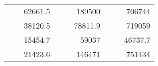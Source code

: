 \begin{table}[H]
\begin{tabular}{|ccrccrccc}
\rowcolor[HTML]{DDFDFF} 
\multicolumn{1}{|c|}{\cellcolor[HTML]{FFFFC7}}                                & \multicolumn{1}{c|}{\cellcolor[HTML]{DDFDFF}}                      & \multicolumn{1}{r|}{\cellcolor[HTML]{DAE8FC}62661.5}   & \multicolumn{1}{c|}{\cellcolor[HTML]{FFFFC7}}                                & \multicolumn{1}{c|}{\cellcolor[HTML]{DDFDFF}}                       & \multicolumn{1}{r|}{\cellcolor[HTML]{DDFDFF}189500}    & \multicolumn{1}{c|}{\cellcolor[HTML]{FFFFC7}}                                & \multicolumn{1}{c|}{\cellcolor[HTML]{DDFDFF}}                      & \multicolumn{1}{r|}{\cellcolor[HTML]{DDFDFF}706744}    \\ \cline{3-3} \cline{6-6} \cline{9-9} 
\multicolumn{1}{|c|}{\cellcolor[HTML]{FFFFC7}}                                & \multicolumn{1}{c|}{\cellcolor[HTML]{DDFDFF}}                      & \multicolumn{1}{r|}{\cellcolor[HTML]{DDFDFF}38120.5}   & \multicolumn{1}{c|}{\cellcolor[HTML]{FFFFC7}}                                & \multicolumn{1}{c|}{\cellcolor[HTML]{DDFDFF}}                       & \multicolumn{1}{r|}{\cellcolor[HTML]{DAE8FC}78811.9}   & \multicolumn{1}{c|}{\cellcolor[HTML]{FFFFC7}}                                & \multicolumn{1}{c|}{\cellcolor[HTML]{DDFDFF}}                      & \multicolumn{1}{r|}{\cellcolor[HTML]{DAE8FC}719059}    \\ \cline{3-3} \cline{6-6} \cline{9-9} 
\rowcolor[HTML]{DDFDFF} 
\multicolumn{1}{|c|}{\cellcolor[HTML]{FFFFC7}}                                & \multicolumn{1}{c|}{\cellcolor[HTML]{DDFDFF}}                      & \multicolumn{1}{r|}{\cellcolor[HTML]{DAE8FC}15454.7}   & \multicolumn{1}{c|}{\cellcolor[HTML]{FFFFC7}}                                & \multicolumn{1}{c|}{\cellcolor[HTML]{DDFDFF}}                       & \multicolumn{1}{r|}{\cellcolor[HTML]{DDFDFF}59037}     & \multicolumn{1}{c|}{\cellcolor[HTML]{FFFFC7}}                                & \multicolumn{1}{c|}{\cellcolor[HTML]{DDFDFF}}                      & \multicolumn{1}{r|}{\cellcolor[HTML]{DDFDFF}46737.7}   \\ \cline{3-3} \cline{6-6} \cline{9-9} 
\multicolumn{1}{|c|}{\cellcolor[HTML]{FFFFC7}}                                & \multicolumn{1}{c|}{\cellcolor[HTML]{DDFDFF}}                      & \multicolumn{1}{r|}{\cellcolor[HTML]{DDFDFF}21423.6}   & \multicolumn{1}{c|}{\cellcolor[HTML]{FFFFC7}}                                & \multicolumn{1}{c|}{\cellcolor[HTML]{DDFDFF}}                       & \multicolumn{1}{r|}{\cellcolor[HTML]{DAE8FC}146471}    & \multicolumn{1}{c|}{\cellcolor[HTML]{FFFFC7}}                                & \multicolumn{1}{c|}{\cellcolor[HTML]{DDFDFF}}                      & \multicolumn{1}{r|}{\cellcolor[HTML]{DAE8FC}751434}    \\ \cline{3-3} \cline{6-6} \cline{9-9} 

\end{tabular}
\end{table}

